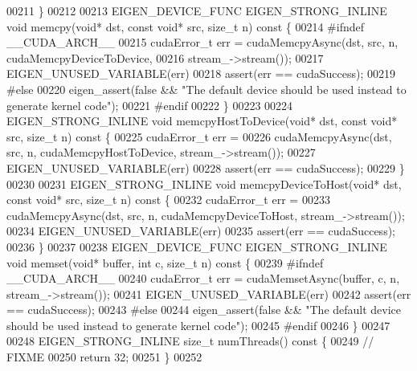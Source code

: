 \begin{DoxyCode}
00211   \}
00212 
00213   EIGEN\_DEVICE\_FUNC EIGEN\_STRONG\_INLINE \textcolor{keywordtype}{void} memcpy(\textcolor{keywordtype}{void}* dst, \textcolor{keyword}{const} \textcolor{keywordtype}{void}* src, \textcolor{keywordtype}{size\_t} n)\textcolor{keyword}{ const }\{
00214 \textcolor{preprocessor}{#ifndef \_\_CUDA\_ARCH\_\_}
00215     cudaError\_t err = cudaMemcpyAsync(dst, src, n, cudaMemcpyDeviceToDevice,
00216                                       stream\_->stream());
00217     EIGEN\_UNUSED\_VARIABLE(err)
00218     assert(err == cudaSuccess);
00219 \textcolor{preprocessor}{#else}
00220   eigen\_assert(\textcolor{keyword}{false} && \textcolor{stringliteral}{"The default device should be used instead to generate kernel code"});
00221 \textcolor{preprocessor}{#endif}
00222   \}
00223 
00224   EIGEN\_STRONG\_INLINE \textcolor{keywordtype}{void} memcpyHostToDevice(\textcolor{keywordtype}{void}* dst, \textcolor{keyword}{const} \textcolor{keywordtype}{void}* src, \textcolor{keywordtype}{size\_t} n)\textcolor{keyword}{ const }\{
00225     cudaError\_t err =
00226         cudaMemcpyAsync(dst, src, n, cudaMemcpyHostToDevice, stream\_->stream());
00227     EIGEN\_UNUSED\_VARIABLE(err)
00228     assert(err == cudaSuccess);
00229   \}
00230 
00231   EIGEN\_STRONG\_INLINE \textcolor{keywordtype}{void} memcpyDeviceToHost(\textcolor{keywordtype}{void}* dst, \textcolor{keyword}{const} \textcolor{keywordtype}{void}* src, \textcolor{keywordtype}{size\_t} n)\textcolor{keyword}{ const }\{
00232     cudaError\_t err =
00233         cudaMemcpyAsync(dst, src, n, cudaMemcpyDeviceToHost, stream\_->stream());
00234     EIGEN\_UNUSED\_VARIABLE(err)
00235     assert(err == cudaSuccess);
00236   \}
00237 
00238   EIGEN\_DEVICE\_FUNC EIGEN\_STRONG\_INLINE \textcolor{keywordtype}{void} memset(\textcolor{keywordtype}{void}* buffer, \textcolor{keywordtype}{int} c, \textcolor{keywordtype}{size\_t} n)\textcolor{keyword}{ const }\{
00239 \textcolor{preprocessor}{#ifndef \_\_CUDA\_ARCH\_\_}
00240     cudaError\_t err = cudaMemsetAsync(buffer, c, n, stream\_->stream());
00241     EIGEN\_UNUSED\_VARIABLE(err)
00242     assert(err == cudaSuccess);
00243 \textcolor{preprocessor}{#else}
00244   eigen\_assert(\textcolor{keyword}{false} && \textcolor{stringliteral}{"The default device should be used instead to generate kernel code"});
00245 \textcolor{preprocessor}{#endif}
00246   \}
00247 
00248   EIGEN\_STRONG\_INLINE \textcolor{keywordtype}{size\_t} numThreads()\textcolor{keyword}{ const }\{
00249     \textcolor{comment}{// FIXME}
00250     \textcolor{keywordflow}{return} 32;
00251   \}
00252 

\end{DoxyCode}
